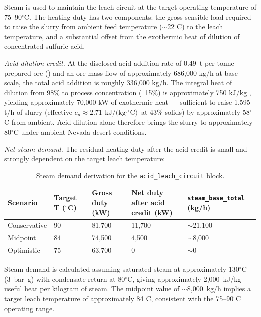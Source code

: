 Steam is used to maintain the leach circuit at the target operating temperature of 75--90$^\circ$C. The heating duty has two components: the gross sensible load required to raise the slurry from ambient feed temperature ($\sim$22$^\circ$C) to the leach temperature, and a substantial offset from the exothermic heat of dilution of concentrated sulfuric acid.

\textit{Acid dilution credit.} At the disclosed acid addition rate of 0.49~t  per tonne prepared ore (\cite{royLithiumClayAssessing2024}) and an ore mass flow of approximately 686,000 \si{kg/h} at base scale, the total acid addition is roughly 336,000 \si{kg/h}. The integral heat of dilution from 98\% to process concentration (~15\%) is approximately 750 \si{kJ/kg} , yielding approximately 70,000 kW of exothermic heat --- sufficient to raise 1,595 \si{t/h} of slurry (effective $c_p \approx 2.71~\text{kJ/(kg$\cdot^\circ$C)}$ at 43\% solids) by approximately 58$^\circ$C from ambient. Acid dilution alone therefore brings the slurry to approximately 80$^\circ$C under ambient Nevada desert conditions.

\textit{Net steam demand.} The residual heating duty after the acid credit is small and strongly dependent on the target leach temperature:

\begin{table}[h!]
\caption{Steam demand derivation for the \texttt{acid\_leach\_circuit} block.}
\centering
\begin{tabular}{lp{2cm}p{2.3cm}p{3.5cm}p{3cm}}
\toprule
\textbf{Scenario} & \textbf{Target T ($^\circ$C)} & \textbf{Gross duty (kW)} & \textbf{Net duty after acid credit (kW)} & \texttt{steam\_base\_total} \textbf{(kg/h)} \\
\midrule
Conservative & 90 & 81,700 & 11,700 & $\sim$21,100 \\
Midpoint     & 84 & 74,500 &  4,500 & $\sim$8,000  \\
Optimistic   & 75 & 63,700 &      0 & $\sim$0      \\
\bottomrule
\end{tabular}
\end{table}

\noindent Steam demand is calculated assuming saturated steam at approximately 130$^\circ$C (3~bar~g) with condensate return at 80$^\circ$C, giving approximately 2,000~kJ/kg useful heat per kilogram of steam. The midpoint value of $\sim$8,000~kg/h implies a target leach temperature of approximately 84$^\circ$C, consistent with the 75--90$^\circ$C operating range.

